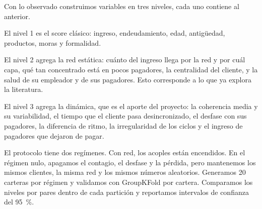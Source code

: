 \begin{decir}
Con lo observado construimos variables en tres niveles, cada uno contiene al anterior.

El nivel 1 es el score clásico: ingreso, endeudamiento, edad, antigüedad, productos,
moras y formalidad.

El nivel 2 agrega la red estática: cuánto del ingreso llega por la red y por cuál capa,
qué tan concentrado está en pocos pagadores, la centralidad del cliente, y la salud de su
empleador y de sus pagadores. Esto corresponde a lo que ya explora la literatura.

El nivel 3 agrega la dinámica, que es el aporte del proyecto: la coherencia media y su
variabilidad, el tiempo que el cliente pasa desincronizado, el desfase con sus pagadores,
la diferencia de ritmo, la irregularidad de los ciclos y el ingreso de pagadores que
dejaron de pagar.

El protocolo tiene dos regímenes. Con red, los acoples están encendidos. En el régimen
nulo, apagamos el contagio, el desfase y la pérdida, pero mantenemos los mismos clientes,
la misma red y los mismos números aleatorios. Generamos 20 carteras por régimen y
validamos con GroupKFold por cartera. Comparamos los niveles por pares dentro de cada
partición y reportamos intervalos de confianza del 95~\%.
\end{decir}
